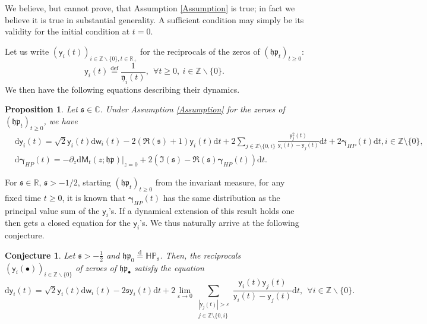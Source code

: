 \documentclass[]{article}
\newtheorem{prop}[thm]{Proposition}
\newtheorem{conj}[thm]{Conjecture}
\begin{document}
We believe, but cannot prove, that Assumption \ref{Assumption} is true; in fact we believe it is true in substantial generality. A sufficient condition may simply be its validity for the initial condition at $t=0$. 

Let us write $(\mathsf{y}_i(t))_{i\in \mathbb{Z}\backslash \{0\},t\in \mathbb{R}_+}$ for the reciprocals of the zeros of $(\mathfrak{hp}_t)_{t\ge 0}$:
\begin{equation}\label{RecipZeros}
\mathsf{y}_i(t)\overset{\mathrm{def}}{=}\frac{1}{\mathfrak{y}_i(t)}, \ \ \forall t\ge0, \ i\in \mathbb{Z}\backslash \{0\}.
\end{equation}
We then have the following equations describing their dynamics.

\begin{prop}\label{HPISDE} Let $\mathfrak{s}\in \mathbb{C}$.
Under Assumption \ref{Assumption} for the zeroes of $(\mathfrak{hp}_t)_{t\ge 0}$, we have
\begin{align*}
&\mathrm{d}\mathsf{y}_i(t)
  = 
 \sqrt{2}\mathsf{y}_i(t)
 \mathrm{d}\mathsf{w}_i(t)
-2\left(\Re{(\mathfrak{s})}
+1\right)\mathsf{y}_i(t)\mathrm{d}t
  +
 2
 \sum_{j\in\mathbb{Z}\setminus\{0,i\}}
\frac{\mathsf{y}_j^2(t)}{\mathsf{y}_i(t)-\mathsf{y}_j(t)}
\mathrm{d}t
+2
\boldsymbol{\gamma}_{HP}(t)
\mathrm{d}t,  i\in\mathbb{Z}\setminus\{0\},\\
&\mathrm{d}\boldsymbol{\gamma}_{HP}(t)
=
-\partial_z \mathrm{d}\mathsf{M}_t(z;\mathfrak{hp})\big|_{z=0}
+
2\left(\Im{(\mathfrak{s})}-\Re{(\mathfrak{s})}\boldsymbol{\gamma}_{HP}(t)\right)\mathrm{d}t.
\end{align*} 
\end{prop}


For $\mathfrak{s}\in \mathbb{R}$, $\mathfrak{s}>-1/2$, starting $(\mathfrak{hp}_t)_{t\ge 0}$ from the invariant measure, for any fixed time $t\ge 0$, it is known that $\boldsymbol{\gamma}_{HP}(t)$ has the same distribution as the principal value sum of the $\mathsf{y}_i$'s. If a dynamical extension of this result holds one then gets a closed equation for the $\mathsf{y}_i$'s. We thus naturally arrive at the following conjecture. 

\begin{conj}\label{ConjHP}
Let $\mathfrak{s} > -\tfrac{1}{2}$ and $\mathfrak{hp}_0\overset{\mathrm{d}}{=}\mathbb{HP}_\mathfrak{s}$. Then, the reciprocals $(\mathsf{y}_{i}(\bullet))_{i\in \mathbb{Z}\backslash\{0\}}$ of zeroes of $\mathfrak{hp}_{\bullet}$ satisfy the equation
\begin{equation*}
\mathrm{d}\mathsf{y}_i(t)
= \sqrt{2}\mathsf{y}_i(t)\mathrm{d}\mathsf{w}_i(t)
- 2\mathfrak{s}\mathsf{y}_i(t)\mathrm{d}t
+ 2 \lim_{\varepsilon\to 0}
\sum_{\substack{|\mathsf{y}_j(t)|>\varepsilon\\ j\in \mathbb{Z}\setminus\{0,i\}}}
\frac{\mathsf{y}_i(t)\mathsf{y}_j(t)}{\mathsf{y}_i(t)-\mathsf{y}_j(t)}\mathrm{d}t, \ \ \forall {i}\in \mathbb{Z}\backslash \{0\}.
\end{equation*}
\end{conj}
\end{document}
